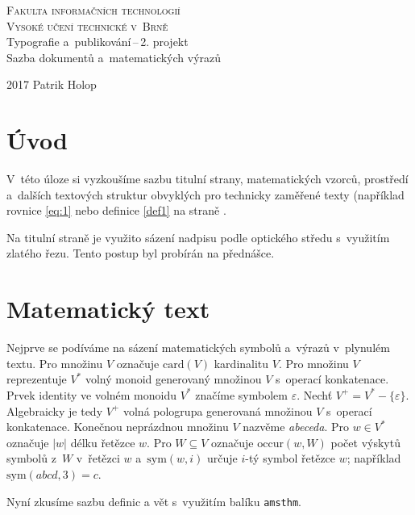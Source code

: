 \documentclass[11pt,twocolumn,a4paper]{article}
\theoremstyle{definition}
\theoremstyle{plain}
\begin{document}
\begin{titlepage}
 \begin{center}
 {
  \Huge
  \textsc{Fakulta informačních technologií\\
  \vspace{-3.5mm}
  Vysoké učení technické v~Brně}\\
 }
 {
  \LARGE
  Typografie a~publikování\,--\,2. projekt\\
  \vspace{-2.05mm}
  Sazba dokumentů a~matematických výrazů\\
 }
 \end{center}
{\Large 2017 \hfill Patrik Holop}
\end{titlepage}

\section*{Úvod}
V~této úloze si vyzkoušíme sazbu titulní strany, matematických vzorců, prostředí a~dalších textových struktur obvyklých pro technicky zaměřené texty (například rovnice \eqref{eq:1} nebo definice \ref{def1} na straně \pageref{def1}.

Na titulní straně je využito sázení nadpisu podle optického středu s~využitím zlatého řezu. Tento postup byl probírán na přednášce.


\section{Matematický text}

Nejprve se podíváme na sázení matematických symbolů a~výrazů v~plynulém textu. Pro množinu $V$ označuje $\mbox{card}(V)$ kardinalitu $V$.
Pro množinu $V$ reprezentuje $V^*$ volný monoid generovaný množinou $V$ s~operací konkatenace.
Prvek identity ve volném monoidu $V^*$ značíme symbolem $\varepsilon$.
Nechť $V^+=V^*-\{\varepsilon\}$. Algebraicky je tedy $V^+$ volná pologrupa generovaná množinou $V$ s~operací konkatenace.
Konečnou neprázdnou množinu $V$ nazvěme \textit{abeceda}.
Pro $w\in V^*$ označuje $|w|$ délku řetězce $w$. Pro $W\subseteq V$ označuje $\mbox{occur}(w,W)$ počet výskytů symbolů z~$W$ v~řetězci $w$ a~$\mbox{sym}(w, i)$ určuje $i$-tý symbol řetězce $w$; například $\mbox{sym}(abcd,3) = c$.

Nyní zkusíme sazbu definic a vět s~využitím balíku \texttt{amsthm}.
\end{document}
